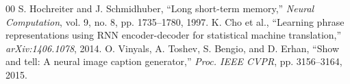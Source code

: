\documentclass[conference]{IEEEtran}
\begin{document}

\begin{thebibliography}{00}
 S. Hochreiter and J. Schmidhuber, ``Long short-term memory,'' \textit{Neural Computation}, vol. 9, no. 8, pp. 1735--1780, 1997.
 K. Cho et al., ``Learning phrase representations using RNN encoder-decoder for statistical machine translation,'' \textit{arXiv:1406.1078}, 2014.
 O. Vinyals, A. Toshev, S. Bengio, and D. Erhan, ``Show and tell: A neural image caption generator,'' \textit{Proc. IEEE CVPR}, pp. 3156--3164, 2015.
\end{thebibliography}
\end{document}
